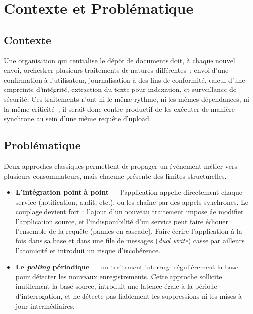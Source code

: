 \documentclass[12pt,a4paper,openany]{report}
\begin{document}
    \chapter{Contexte et Probl\'ematique}

    \section{Contexte}

    Une organisation qui centralise le d\'ep\^ot de documents doit, \`a chaque nouvel envoi, orchestrer plusieurs traitements de natures diff\'erentes~: envoi d'une confirmation \`a l'utilisateur, journalisation \`a des fins de conformit\'e, calcul d'une empreinte d'int\'egrit\'e, extraction du texte pour indexation, et surveillance de s\'ecurit\'e. Ces traitements n'ont ni le m\^eme rythme, ni les m\^emes d\'ependances, ni la m\^eme criticit\'e~; il serait donc contre-productif de les ex\'ecuter de mani\`ere synchrone au sein d'une m\^eme requ\^ete d'upload.

    \section{Probl\'ematique}

    Deux approches classiques permettent de propager un \'ev\'enement m\'etier vers plusieurs consommateurs, mais chacune pr\'esente des limites structurelles.

    \begin{itemize}
      \item \textbf{L'int\'egration point \`a point} --- l'application appelle directement chaque service (notification, audit, etc.), ou les cha\^ine par des appels synchrones. Le couplage devient fort~: l'ajout d'un nouveau traitement impose de modifier l'application source, et l'indisponibilit\'e d'un service peut faire \'echouer l'ensemble de la requ\^ete (pannes en cascade). Faire \'ecrire l'application \`a la fois dans sa base et dans une file de messages (\emph{dual write}) casse par ailleurs l'atomicit\'e et introduit un risque d'incoh\'erence.
      \item \textbf{Le \emph{polling} p\'eriodique} --- un traitement interroge r\'eguli\`erement la base pour d\'etecter les nouveaux enregistrements. Cette approche sollicite inutilement la base source, introduit une latence \'egale \`a la p\'eriode d'interrogation, et ne d\'etecte pas fiablement les suppressions ni les mises \`a jour interm\'ediaires.
    \end{itemize}
\end{document}
